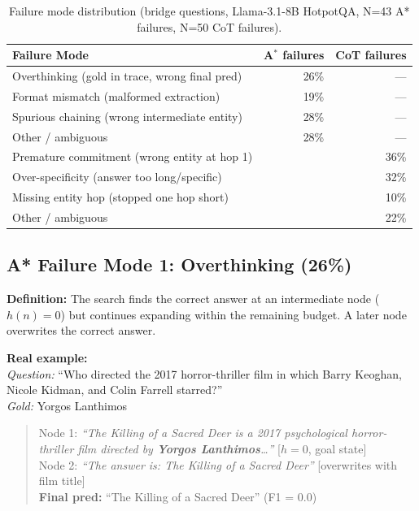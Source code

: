 \documentclass{article}
\newcommand{\astar}{A$^*$\xspace}
\begin{document}
\begin{table}[h]
\centering
\caption{Failure mode distribution (bridge questions, Llama-3.1-8B HotpotQA, N=43 A* failures, N=50 CoT failures).}
\label{tab:failure_taxonomy}
\begin{tabular}{lrr}
\toprule
Failure Mode & \astar failures & CoT failures \\
\midrule
Overthinking (gold in trace, wrong final pred) & 26\% & --- \\
Format mismatch (malformed extraction)          & 19\% & --- \\
Spurious chaining (wrong intermediate entity)   & 28\% & --- \\
Other / ambiguous                               & 28\% & --- \\
\midrule
Premature commitment (wrong entity at hop 1)    & \textendash{} &36\% \\
Over-specificity (answer too long/specific)     & \textendash{} &32\% \\
Missing entity hop (stopped one hop short)      & \textendash{} &10\% \\
Other / ambiguous                               & \textendash{} &22\% \\
\bottomrule
\end{tabular}
\end{table}

\subsection{A* Failure Mode 1: Overthinking (26\%)}

\textbf{Definition:} The search finds the correct answer at an intermediate node ($h(n)=0$) but continues expanding within the remaining budget. A later node overwrites the correct answer.

\textbf{Real example:}\\
\textit{Question:} ``Who directed the 2017 horror-thriller film in which Barry Keoghan, Nicole Kidman, and Colin Farrell starred?''\\
\textit{Gold:} Yorgos Lanthimos

\begin{quote}
Node 1: \textit{``The Killing of a Sacred Deer is a 2017 psychological horror-thriller film directed by \textbf{Yorgos Lanthimos}\ldots''} [$h=0$, goal state]\\
Node 2: \textit{``The answer is: The Killing of a Sacred Deer''} [overwrites with film title]\\
\textbf{Final pred:} ``The Killing of a Sacred Deer'' (F1 = 0.0)
\end{quote}
\end{document}
